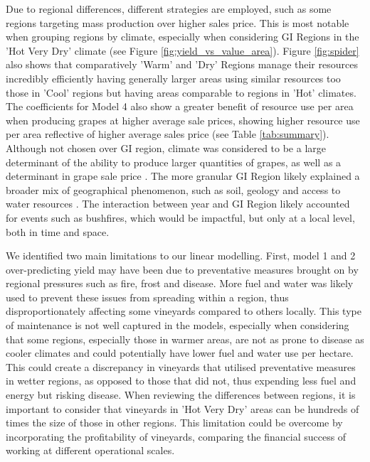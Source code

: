 \documentclass[review,12pt,authoryear]{elsarticle}
\begin{document}
\begin{linenumbers}
\par
Due to regional differences, different strategies are  employed, such as some regions targeting mass production over higher sales price. This is most notable when grouping regions by climate, especially when considering GI Regions in the 'Hot Very Dry' climate (see Figure \ref{fig:yield_vs_value_area}). Figure \ref{fig:spider} also shows that comparatively 'Warm' and 'Dry' Regions manage their resources incredibly efficiently having generally larger areas using similar resources too those in 'Cool' regions but having areas comparable to regions in 'Hot' climates. The coefficients for Model 4 also show a greater benefit of resource use per area when producing grapes at higher average sale prices, showing higher resource use per area reflective of higher average sales price (see Table \ref{tab:summary}).
Although not chosen over GI region, climate was considered to be a large determinant of the ability to produce larger quantities of grapes, as well as a determinant in grape sale price \citep{agostaRegionalClimateVariability2012}. The more granular GI Region likely explained a broader mix of geographical phenomenon, such as soil, geology and access to water resources \citep{abbalDecisionSupportSystem2016,carmonaUseParticipatoryObjectOriented2011}. The interaction between year and GI Region likely accounted for events such as bushfires, which would be impactful, but only at a local level, both in time and space.
\par
We identified two main limitations to our linear modelling. First, model 1 and 2 over-predicting yield may have been due to preventative measures brought on by regional pressures such as fire, frost and disease. More fuel and water was likely used to prevent these issues from spreading within a region, thus disproportionately affecting some vineyards compared to others locally. This type of maintenance is not well captured in the models, especially when considering that some regions, especially those in warmer areas, are not as prone to disease as cooler climates and could potentially have lower fuel and water use per hectare. This could create a discrepancy in vineyards that utilised preventative measures in wetter regions, as opposed to those that did not, thus expending less fuel and energy but risking disease. When reviewing the differences between regions, it is important to consider that vineyards in 'Hot Very Dry' areas can be hundreds of times the size of those in other regions. This limitation could be overcome by incorporating the profitability of vineyards, comparing the financial success of working at different operational scales.

\end{linenumbers}
\end{document}
